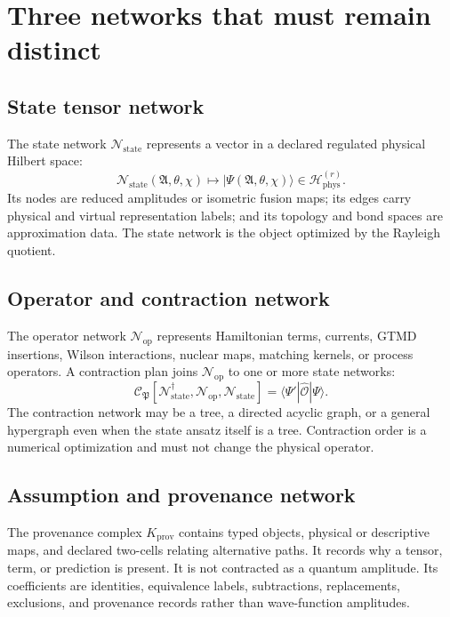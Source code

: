 \documentclass[11pt]{article}
\newcommand{\Hil}{\mathcal H}
\newcommand{\cO}{\mathcal O}
\newcommand{\cC}{\mathcal C}
\newcommand{\phys}{\mathrm{phys}}
\newcommand{\Aset}{\mathfrak A}
\newcommand{\Pplan}{\mathfrak P}
\newcommand{\Nstate}{\mathcal N_{\mathrm{state}}}
\newcommand{\Nop}{\mathcal N_{\mathrm{op}}}
\newcommand{\Kprov}{K_{\mathrm{prov}}}
\begin{document}
\section{Three networks that must remain distinct}
\label{sec:three-networks}

\subsection{State tensor network}

The state network \(\Nstate\) represents a vector in a declared regulated
physical Hilbert space:
\begin{equation}
 \Nstate(\Aset,\theta,\chi)
 \longmapsto
 |\Psi(\Aset,\theta,\chi)\rangle
 \in \Hil_{\phys}^{(r)}.
\label{eq:state-network}
\end{equation}
Its nodes are reduced amplitudes or isometric fusion maps; its edges carry
physical and virtual representation labels; and its topology and bond spaces
are approximation data.  The state network is the object optimized by the
Rayleigh quotient.

\subsection{Operator and contraction network}

The operator network \(\Nop\) represents Hamiltonian terms, currents, GTMD
insertions, Wilson interactions, nuclear maps, matching kernels, or process
operators.  A contraction plan joins \(\Nop\) to one or more state networks:
\begin{equation}
 \cC_{\Pplan}
 \left[
 \Nstate^{\dagger},\Nop,\Nstate
 \right]
 =
 \langle\Psi'|\widehat{\cO}|\Psi\rangle.
\label{eq:operator-contraction}
\end{equation}
The contraction network may be a tree, a directed acyclic graph, or a general
hypergraph even when the state ansatz itself is a tree.  Contraction order is a
numerical optimization and must not change the physical operator.

\subsection{Assumption and provenance network}

The provenance complex \(\Kprov\) contains typed objects, physical or
descriptive maps, and declared two-cells relating alternative paths.  It
records why a tensor, term, or prediction is present.  It is not contracted as
a quantum amplitude.  Its coefficients are identities, equivalence labels,
subtractions, replacements, exclusions, and provenance records rather than
wave-function amplitudes.
\end{document}
